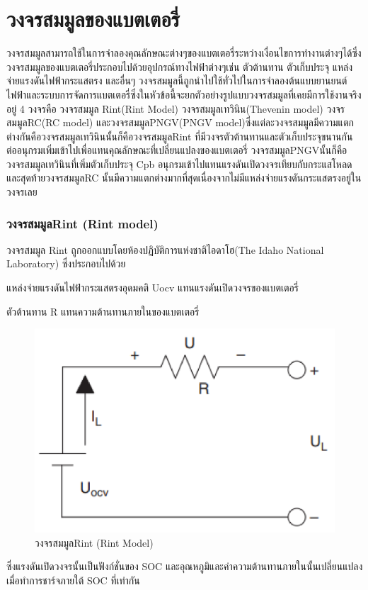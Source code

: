 \section{วงจรสมมูลของแบตเตอรี่}
	วงจรสมมูลสามารถใช้ในการจำลองคุณลักษณะต่างๆของแบตเตอรี่ระหว่างเงื่อนไขการทำงานต่างๆได้ซึ่งวงจรสมมูลของแบตเตอรี่ประกอบไปด้วยอุปกรณ์ทางไฟฟ้าต่างๆเช่น ตัวต้านทาน ตัวเก็บประจุ แหล่งจ่ายแรงดันไฟฟ้ากระแสตรง และอื่นๆ วงจรสมมูลนี้ถูกนำไปใช้ทั่วไปในการจำลองต้นแบบยานยนต์ไฟฟ้าและระบบการจัดการแบตเตอรี่ซึ่งในหัวข้อนี้จะยกตัวอย่างรูปแบบวงจรสมมูลที่เคยมีการใช้งานจริงอยู่ 4 วงจรคือ วงจรสมมูล Rint(Rint Model) วงจรสมมูลเทวินิน(Thevenin model) วงจรสมมูลRC(RC model) และวงจรสมมูลPNGV(PNGV model)ซึ่งแต่ละวงจรสมมูลมีความแตกต่างกันคือวงจรสมมูลเทวินินนั้นก็คือวงจรสมมูลRint ที่มีวงจรตัวต้านทานและตัวเก็บประจุขนานกันต่ออนุกรมเพิ่มเข้าไปเพื่อแทนคุณลักษณะที่เปลี่ยนแปลงของแบตเตอรี่ วงจรสมมูลPNGVนั้นก็คือวงจรสมมูลเทวินินที่เพิ่มตัวเก็บประจุ Cpb อนุกรมเข้าไปแทนแรงดันเปิดวงจรเทียบกับกระแสโหลด และสุดท้ายวงจรสมมูลRC นั้นมีความแตกต่างมากที่สุดเนื่องจากไม่มีแหล่งจ่ายแรงดันกระแสตรงอยู่ในวงจรเลย\newline
\subsubsection*{วงจรสมมูลRint (Rint model)}
วงจรสมมูล Rint ถูกออกแบบโดยห้องปฏิบัติการแห่งชาติไอดาโฮ(The Idaho National Laboratory) ซึ่งประกอบไปด้วย
\begin{itemize}
{\item แหล่งจ่ายแรงดันไฟฟ้ากระแสตรงอุดมคติ Uocv แทนแรงดันเปิดวงจรของแบตเตอรี่}
{\item ตัวต้านทาน R แทนความต้านทานภายในของแบตเตอรี่}
\end{itemize}
\begin{center}
	\begin{figure}[H]
		\includegraphics[width=0.6\linewidth]{Chapters/img/Rint_model.png}
			\centering
			\captionsetup{justification=centering,margin=2cm}
			\caption{วงจรสมมูลRint (Rint Model)}
	\end{figure}
\end{center}
ซึ่งแรงดันเปิดวงจรนั้นเป็นฟังก์ชั่นของ SOC และอุณหภูมิและค่าความต้านทานภายในนั้นเปลี่ยนแปลงเมื่อทำการชาร์จภายใต้ SOC ที่เท่ากัน\newline
